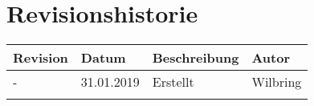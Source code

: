 \section*{Revisionshistorie}
\begin{tabular}{|p{2cm}|p{2cm}|p{7cm}|p{2cm}|}
\hline
Revision & Datum & Beschreibung & Autor  \\
\hline
 -  &   31.01.2019 & Erstellt   & Wilbring  \\\hline
    &               &           &           \\\hline
\end{tabular}